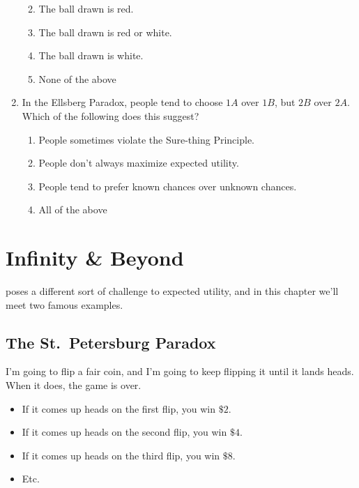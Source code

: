 \documentclass[justified]{tufte-book}
\providecommand{\tightlist}{%
  \setlength{\itemsep}{0pt}\setlength{\parskip}{0pt}}
\theoremstyle{definition}
\theoremstyle{definition}
\theoremstyle{definition}
\theoremstyle{remark}
\begin{document}
\begin{enumerate}
  \begin{enumerate}
  \def\labelenumii{\alph{enumii}.}
  \tightlist
  \item
    The ball drawn is red.
  \item
    The ball drawn is red or white.
  \item
    The ball drawn is white.
  \item
    None of the above
  \end{enumerate}
\item
  In the Ellsberg Paradox, people tend to choose \(1A\) over \(1B\), but \(2B\) over \(2A\). Which of the following does this suggest?

  \begin{enumerate}
  \def\labelenumii{\alph{enumii}.}
  \tightlist
  \item
    People sometimes violate the Sure-thing Principle.
  \item
    People don't always maximize expected utility.
  \item
    People tend to prefer known chances over unknown chances.
  \item
    All of the above
  \end{enumerate}
\end{enumerate}

\hypertarget{infinity-beyond}{%
\chapter{Infinity \& Beyond}\label{infinity-beyond}}

 poses a different sort of challenge to expected utility, and in this chapter we'll meet two famous examples.

\hypertarget{the-st.petersburg-paradox}{%
\section{The St.~Petersburg Paradox}\label{the-st.petersburg-paradox}}

 I'm going to flip a fair coin, and I'm going to keep flipping it until it lands heads. When it does, the game is over.

\begin{itemize}
\tightlist
\item
  If it comes up heads on the first flip, you win \(\$2\).
\item
  If it comes up heads on the second flip, you win \(\$4\).
\item
  If it comes up heads on the third flip, you win \(\$8\).
\item
  Etc.
\end{itemize}
\end{document}
